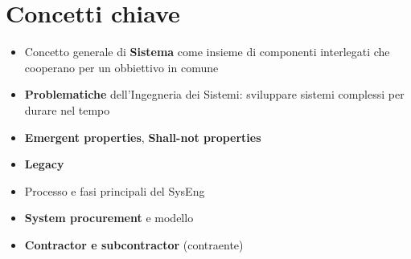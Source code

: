 \section{Concetti chiave}

\begin{itemize}
        \item Concetto generale di \textbf{Sistema} come insieme di
                componenti interlegati che cooperano per un obbiettivo
                in comune
        \item \textbf{Problematiche} dell'Ingegneria dei Sistemi:
                sviluppare sistemi complessi per durare nel tempo
        \item \textbf{Emergent properties}, \textbf{Shall-not properties}
        \item \textbf{Legacy}
        \item Processo e fasi principali del SysEng
        \item \textbf{System procurement} e modello
        \item \textbf{Contractor e subcontractor} (contraente)
\end{itemize}